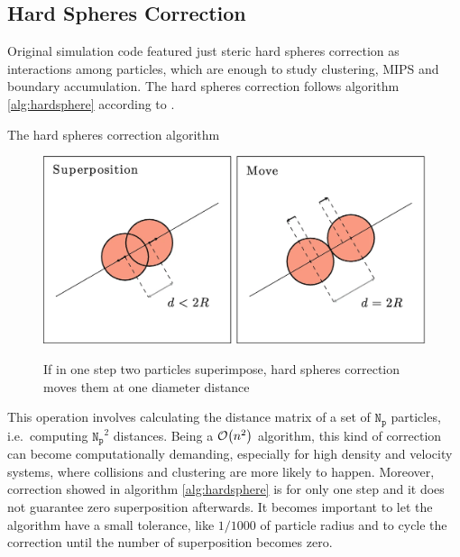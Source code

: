 \documentclass[../../master_thesis_np.tex]{subfiles}
\begin{document}
	\subsection{Hard Spheres Correction}
	\label{hs}
	Original simulation code featured just steric hard spheres correction as interactions among particles, which are enough to study clustering, MIPS and boundary accumulation.
	The hard spheres correction follows algorithm \ref{alg:hardsphere} according to \cite{callegari_numerical_2019}.
	
	\begin{algorithm}[htp]
		\caption{The hard spheres correction algorithm} \label{alg:hardsphere}	
		\begin{algorithmic}[1]
			 
			
			\EndIf
			\EndFor
		\end{algorithmic}
	\end{algorithm}
	
	\begin{figure}[htp]
		\centering
		\includegraphics[width = \textwidth]{callegari_volpe_2019_hardsphere.png}
		\label{fig:hardsphere}
		\caption{If in one step two particles superimpose, hard spheres correction moves them at one diameter distance \cite{callegari_numerical_2019}}
	\end{figure}
	
	This operation involves calculating the distance matrix of a set of $\mathtt{N_p}$ particles, i.e.\ computing $\mathtt{N_p}^2$ distances.
	Being a $\order{n^2}$ algorithm, this kind of correction can become computationally demanding, especially for high density and velocity systems, where collisions and clustering are more likely to happen. 
	Moreover, correction showed in algorithm \ref{alg:hardsphere} is for only one step and it does not guarantee zero superposition afterwards.
	It becomes important to let the algorithm have a small tolerance, like $1/1000$ of particle radius and to cycle the correction until the number of superposition becomes zero.
	
\end{document}
